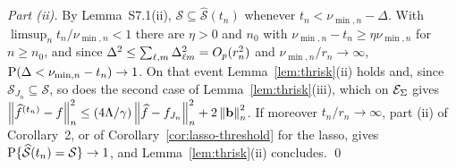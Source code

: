 \emph{Part (ii).} By Lemma~S7.1(ii), $\mathcal{S} \subseteq
\widehat{\mathcal{S}}(t_n)$ whenever $t_n < \nu_{\min,n} - \Delta$. With
$\limsup_n t_n/\nu_{\min,n} < 1$ there are $\eta > 0$ and $n_0$ with
$\nu_{\min,n} - t_n \ge \eta\nu_{\min,n}$ for $n \ge n_0$, and since
$\Delta^{2} \le \sum_{\ell,m}\Delta_{\ell m}^{2} = O_p(r_n^{2})$ and
$\nu_{\min,n}/r_n \to \infty$, $\mathrm{P}(\Delta < \nu_{\min,n} - t_n) \to 1$. On
that event Lemma~\ref{lem:thrisk}(ii) holds and, since
$\mathcal{S}_{J_n} \subseteq \mathcal{S}$, so does the second case of
Lemma~\ref{lem:thrisk}(iii), which on $\mathcal{E}_{\Sigma}$ gives
$\left\lVert \widehat{f}^{(t_n)}-f \right\rVert_{n}^{2} \le
(4\Lambda/\gamma)\left\lVert \widehat{f}-f_{J_n} \right\rVert_{n}^{2} + 2\left\lVert \mathbf{b} \right\rVert_{n}^{2}$. If
moreover $t_n/r_n \to \infty$, part (ii) of Corollary~2, or of
Corollary~\ref{cor:lasso-threshold} for the lasso, gives
$\mathrm{P}\{\widehat{\mathcal{S}}(t_n) = \mathcal{S}\} \to 1$, and
Lemma~\ref{lem:thrisk}(ii) concludes. \qed




